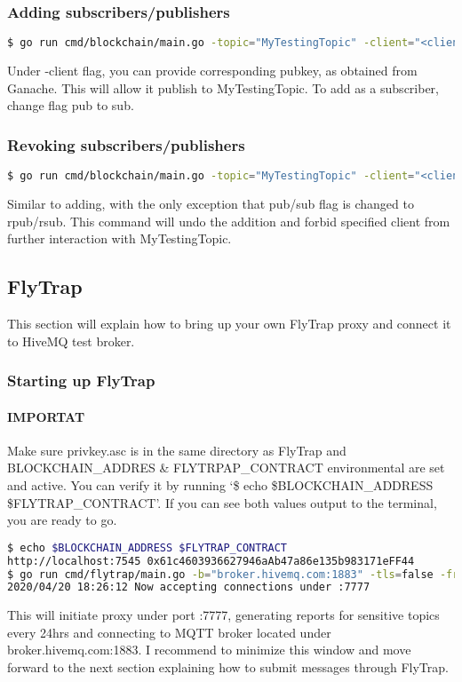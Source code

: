 \subsubsection{Adding subscribers/publishers}
\begin{lstlisting}[language=bash,breaklines=true]
$ go run cmd/blockchain/main.go -topic="MyTestingTopic" -client="<client_pubkey>" -pub="Addining a new publisher"
\end{lstlisting}
Under -client flag, you can provide corresponding pubkey, as obtained from Ganache. This will allow it publish to MyTestingTopic. To add as a subscriber, change flag pub to sub.
\subsubsection{Revoking subscribers/publishers}
\begin{lstlisting}[language=bash,breaklines=true]
$ go run cmd/blockchain/main.go -topic="MyTestingTopic" -client="<client_pubkey>" -rpub="Revoking publisher"
\end{lstlisting}
Similar to adding, with the only exception that pub/sub flag is changed to rpub/rsub. This command will undo the addition and forbid specified client from further interaction with MyTestingTopic.
\subsection{FlyTrap}
This section will explain how to bring up your own FlyTrap proxy and connect it to HiveMQ test broker.
\subsubsection{Starting up FlyTrap}
\paragraph{IMPORTAT} Make sure privkey.asc is in the same directory as FlyTrap and BLOCKCHAIN\_ADDRES \& FLYTRPAP\_CONTRACT environmental are set and active. You can verify it by running `\$ echo \$BLOCKCHAIN\_ADDRESS \$FLYTRAP\_CONTRACT'. If you can see both values output to the terminal, you are ready to go.
\begin{lstlisting}[language=bash,breaklines=true]
$ echo $BLOCKCHAIN_ADDRESS $FLYTRAP_CONTRACT
http://localhost:7545 0x61c4603936627946aAb47a86e135b983171eFF44
$ go run cmd/flytrap/main.go -b="broker.hivemq.com:1883" -tls=false -freq=24h -p ":7777"
2020/04/20 18:26:12 Now accepting connections under :7777
\end{lstlisting}
This will initiate proxy under port :7777, generating reports for sensitive topics every 24hrs and connecting to MQTT broker located under broker.hivemq.com:1883. I recommend to minimize this window and move forward to the next section explaining how to submit messages through FlyTrap.
